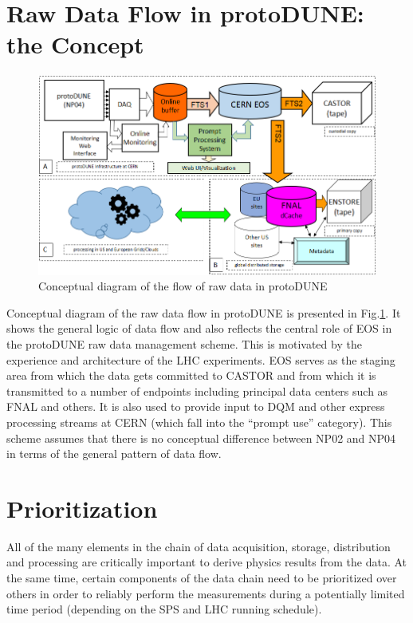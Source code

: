 \documentclass[12pt]{article}
\newcommand{\pd}{protoDUNE\xspace}
\begin{document}
\section{Raw Data Flow in \pd: the Concept}
\label{sec:raw_concept}
\begin{figure}[tbh]
\centering\includegraphics[width=\linewidth]{figures/protoDUNE_data_flow_2017_v2.png}
\caption{\label{fig:raw_concept}Conceptual diagram of the flow of raw data in \pd}
\end{figure}

\noindent
Conceptual diagram of the raw data flow in \pd is presented in Fig.\ref{fig:raw_concept}. It shows the general logic
of data flow and also reflects the central role of EOS in the \pd raw data management scheme. This is motivated by the experience
and architecture of the LHC experiments. EOS serves as the staging area from which the data gets committed to CASTOR
and from which it is transmitted to a number of endpoints including principal data centers such as FNAL and others.
It is also used to provide input to DQM and other express processing streams at CERN (which fall into the ``prompt use'' category).
This scheme assumes that there is no conceptual difference between NP02 and NP04 in terms of the general pattern of data flow.


\section{Prioritization}

All of the many elements in the chain of data acquisition, storage, distribution and processing are critically important to derive physics results  from the data.
At the same time, certain components of the data chain need to be prioritized over others in order to reliably perform the measurements during a potentially
limited time period (depending on the SPS and LHC running schedule).
\end{document}
